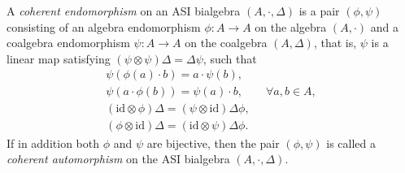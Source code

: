 \documentclass[pdftex]{sigma}
\numberwithin{equation}{section}
\newcommand{\id}{\mathrm{id}}
\begin{document}
\begin{Definition}
 A \textit{coherent endomorphism} on an ASI bialgebra $(A, \cdot, \Delta)$ is a pair $(\phi, \psi)$
 consisting of an algebra endomorphism $\phi\colon A \to A$ on the algebra $(A,\cdot)$ and a coalgebra endomorphism $\psi\colon A \to A$ on the coalgebra $(A,\Delta)$, that is, $\psi$ is a linear map satisfying $(\psi \otimes \psi)\Delta = \Delta \psi$,
 such that
 \begin{gather}
 \psi(\phi(a) \cdot b) = a \cdot \psi(b), \label{eq:coendo1} \\
 \psi(a \cdot \phi(b)) = \psi(a) \cdot b, \qquad \forall a, b \in A, \label{eq:coendo2} \\
 (\id \otimes \phi)\Delta = (\psi \otimes \id )\Delta \phi, \label{eq:coendo3}\\
 (\phi \otimes \id)\Delta = (\id \otimes \psi) \Delta \phi. \label{eq:coendo4}
 \end{gather}
 If in addition both $\phi$ and $\psi$ are bijective,
 then the pair $(\phi, \psi)$ is called a \textit{coherent automorphism} on the ASI bialgebra $(A, \cdot, \Delta)$.
\end{Definition}
\end{document}
